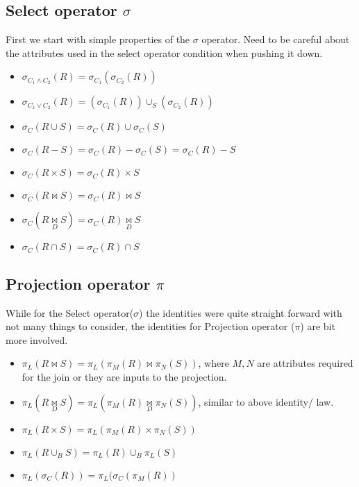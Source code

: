 \subsection{Select operator $\sigma$}
First we start with simple properties of the $\sigma$ operator. Need to be careful about the attributes used in the select operator condition when pushing it down.
\begin{itemize}
    \item $\sigma_{C_1 \land C_2}(R) = \sigma_{C_1}(\sigma_{C_2}(R)) $
    \item $\sigma_{C_1 \lor C_2}(R) = (\sigma_{C_1}(R)) \cup_S (\sigma_{C_2}(R))$
    \item $\sigma_{C}(R \cup S) = \sigma_{C}(R) \cup \sigma_{C}(S)$
    \item $\sigma_{C}(R - S) = \sigma_{C}(R) - \sigma_{C}(S) = \sigma_{C}(R) - S$
    \item $\sigma_{C}(R \times S) = \sigma_{C}(R) \times S$
    \item $\sigma_{C}(R \bowtie S) = \sigma_{C}(R) \bowtie S$
    \item $\sigma_{C}(R \underset{D}{\bowtie} S) = \sigma_{C}(R) \underset{D}{\bowtie} S$
    \item $\sigma_{C}(R \cap S) = \sigma_{C}(R) \cap S$
\end{itemize}

\subsection{Projection operator $\pi$}
While for the Select operator($\sigma$) the identities were quite straight forward with not many things to consider, the identities for Projection operator ($\pi$) are bit more involved.
\begin{itemize}
    \item $\pi_{L}(R \bowtie S) = \pi_{L}(\pi_{M}(R) \bowtie \pi_{N}(S))$, where $M,N$ are attributes required for the join or they are inputs to the projection.
    \item $\pi_{L}(R \underset{D}{\bowtie} S) = \pi_{L}(\pi_{M}(R) \underset{D}{\bowtie} \pi_{N}(S))$, similar to above identity/ law.
    \item $\pi_{L}(R \times S) = \pi_{L}(\pi_{M}(R) \times \pi_{N}(S))$
    \item $\pi_{L}(R \cup_{B} S) = \pi_{L}(R) \cup_{B} \pi_{L}(S)$
    \item $\pi_{L}(\sigma_{C}(R))=\pi_{L}(\sigma_{C}(\pi_{M}(R))$
\end{itemize}

